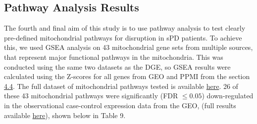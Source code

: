 \documentclass{article}
\begin{document}
\subsection{Pathway Analysis Results}
The fourth and final aim of this study is to use pathway analysis to test clearly pre-defined mitochondrial pathways for disruption in sPD patients. To achieve this, we used GSEA analysis on 43 mitochondrial gene sets from multiple sources, that represent major functional pathways in the mitochondria. This was conducted using the same two datasets as the DGE, so GSEA results were calculated using the Z-scores for all genes from GEO and PPMI from the section \hyperref[subsec:DGE]{4.4}. The full dataset of mitochondrial pathways tested is available \href{https://github.com/Thomas-brightwell/PD-MSc-project-code/blob/main/Thesis/Supplementary%20materials/mito43.gmt}{here}. 26 of these 43 mitochondrial pathways were significantly (FDR $\leq0.05$) down-regulated in the observational case-control expression data from the GEO, (full results available
\href{https://github.com/Thomas-brightwell/PD-MSc-project-code/blob/main/Thesis/Supplementary%20materials/GEO_gsea_results.csv}{here}), shown below in Table 9.
\end{document}

